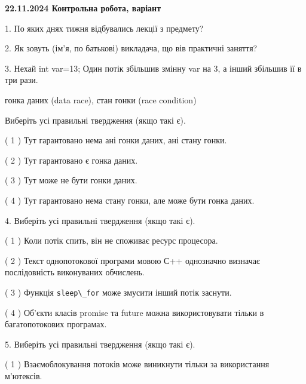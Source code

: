 \documentclass[12pt, ukrainian]{article}
\def\code#1{\Verb!#1!}
\begin{document}
\vspace{4mm}
\newpage
\begin {large}

\textbf{22.11.2024 Контрольна робота, варіант  }\par


{
1. По яких днях тижня відбувались лекції з предмету?



\vspace{5mm}
2. Як зовуть (ім'я, по батькові) викладача, що вів практичні заняття?



\vspace{5mm}
3. Нехай int var=13; Один потік збільшив змінну var на 3, а інший збільшив її в три рази.

гонка даних (data race), стан гонки (race condition)

Виберіть усі правильні твердження (якщо такі є).\par
\vspace{2mm}
( 1 ) Тут гарантовано нема ані гонки даних, ані стану гонки.%

( 2 ) Тут гарантовано є гонка даних.%

( 3 ) Тут може не бути гонки даних.%

( 4 ) Тут гарантовано нема стану гонки, але може бути гонка даних.%


\vspace{5mm}
4. Виберіть усі правильні твердження (якщо такі є).\par
\vspace{2mm}

( 1 ) Коли потік спить, він не споживає ресурс процесора.%

( 2 ) Текст однопотокової програми мовою С++ однозначно визначає послідовність виконуваних обчислень.%

( 3 ) Функція \code{sleep\_for} може змусити інший потік заснути.%

( 4 ) Об’єкти класів promise та future можна використовувати тільки в багатопотокових програмах.%


\vspace{5mm}
5. Виберіть усі правильні твердження (якщо такі є).\par
\vspace{2mm}

( 1 ) Взаємоблокування потоків може виникнути тільки за використання м’ютексів.%

}
\end{large}
\end{document}

